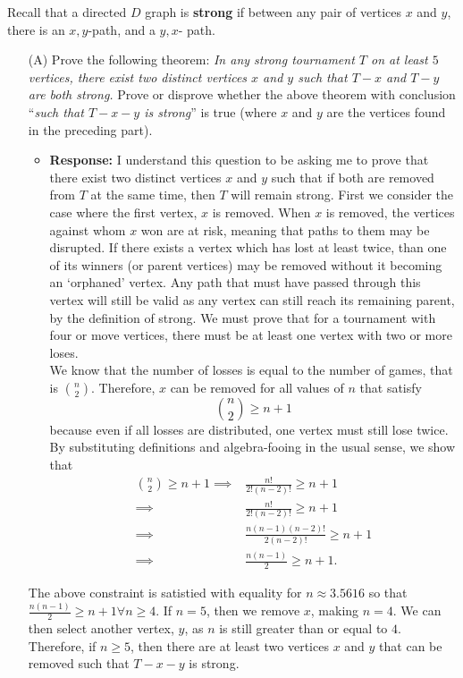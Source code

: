 \documentclass{article}
\newcommand{\response}[1]{\begin{itemize} \item {\bf Response: } #1 \end{itemize}}
\begin{document}
  Recall that a directed $D$ graph is {\bf strong} if between any pair of vertices $x$ and $y$, there is an $x,y$-path, and a $y,x$- path.  
\begin{enumerate} 
	\item[(A)] Prove the following theorem:  \emph{In any strong tournament $T$ on at least $5$ vertices, there exist two distinct vertices $x$ and $y$ such that $T-x$ and $T-y$ are both strong.} Prove or disprove whether the above theorem with conclusion ``\emph{such that $T - x - y$ is strong}'' is true (where $x$ and $y$ are the vertices found in the preceding part). 
		\response{I understand this question to be asking me to prove that there exist two distinct vertices $x$ and $y$ such that if both are removed from $T$ at the same time, then $T$ will remain strong. First we consider the case where the first vertex, $x$ is removed. When $x$ is removed, the vertices against whom $x$ won are at risk, meaning that paths to them may be disrupted. If there exists a vertex which has lost at least twice, than one of its winners (or parent vertices) may be removed without it becoming an `orphaned' vertex.  Any path that must have passed through this vertex will still be valid as any vertex can still reach its remaining parent, by the definition of strong. We must prove that for a tournament with four or move vertices, there must be at least one vertex with two or more loses. \\[1em]
		We know that the number of losses is equal to the number of games, that is ${n \choose 2}$.  Therefore, $x$ can be removed for all values of $n$ that satisfy
		\begin{equation*}
			{n \choose 2} \ge n + 1
		\end{equation*}
		because even if all losses are distributed, one vertex must still lose twice. By substituting definitions and algebra-fooing in the usual sense, we show that
		\begin{equation*}\begin{aligned}
			{n \choose 2} \ge n + 1 \implies &\frac{n!}{2!(n - 2)!} \ge n + 1 \\	
						\implies &\frac{n!}{2!(n - 2)!} \ge n + 1 \\	
						\implies & \frac{n(n-1)(n-2)!}{2(n-2)!} \ge n + 1 \\
						\implies & \frac{n(n-1)}{2} \ge n + 1.
		\end{aligned}\end{equation*}}
		The above constraint is satistied with equality for $n \approx 3.5616$ so that $\frac{n(n-1)}{2} \ge n + 1 \forall n \ge 4$.  If $n = 5$, then we remove $x$, making $n = 4$. We can then select another vertex, $y$, as $n$ is still greater than or equal to $4$. Therefore, if $n \ge 5$, then there are at least two vertices $x$ and $y$ that can be removed such that $T - x - y$ is strong.

\end{enumerate}
\end{document}
